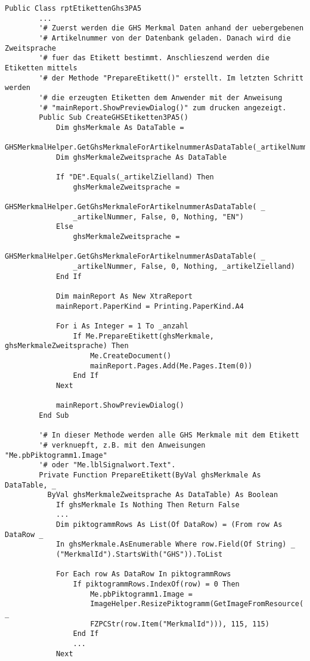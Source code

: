 \begin{lstlisting}[style=A, caption=Auszug Routine Etikettenerstellung (.NET),
label={code:etiketten}]
    Public Class rptEtikettenGhs3PA5
        ...
        '# Zuerst werden die GHS Merkmal Daten anhand der uebergebenen
        '# Artikelnummer von der Datenbank geladen. Danach wird die Zweitsprache
        '# fuer das Etikett bestimmt. Anschlieszend werden die Etiketten mittels
        '# der Methode "PrepareEtikett()" erstellt. Im letzten Schritt werden 
        '# die erzeugten Etiketten dem Anwender mit der Anweisung
        '# "mainReport.ShowPreviewDialog()" zum drucken angezeigt.
        Public Sub CreateGHSEtiketten3PA5()
            Dim ghsMerkmale As DataTable = 
            GHSMerkmalHelper.GetGhsMerkmaleForArtikelnummerAsDataTable(_artikelNummer)
            Dim ghsMerkmaleZweitsprache As DataTable
    
            If "DE".Equals(_artikelZielland) Then
                ghsMerkmaleZweitsprache = 
                GHSMerkmalHelper.GetGhsMerkmaleForArtikelnummerAsDataTable( _ 
                _artikelNummer, False, 0, Nothing, "EN")
            Else
                ghsMerkmaleZweitsprache = 
                GHSMerkmalHelper.GetGhsMerkmaleForArtikelnummerAsDataTable( _ 
                _artikelNummer, False, 0, Nothing, _artikelZielland)
            End If
    
            Dim mainReport As New XtraReport
            mainReport.PaperKind = Printing.PaperKind.A4
    
            For i As Integer = 1 To _anzahl
                If Me.PrepareEtikett(ghsMerkmale, ghsMerkmaleZweitsprache) Then
                    Me.CreateDocument()
                    mainReport.Pages.Add(Me.Pages.Item(0))
                End If
            Next
    
            mainReport.ShowPreviewDialog()
        End Sub
        
        '# In dieser Methode werden alle GHS Merkmale mit dem Etikett
        '# verknuepft, z.B. mit den Anweisungen "Me.pbPiktogramm1.Image" 
        '# oder "Me.lblSignalwort.Text".
        Private Function PrepareEtikett(ByVal ghsMerkmale As DataTable, _
          ByVal ghsMerkmaleZweitsprache As DataTable) As Boolean
            If ghsMerkmale Is Nothing Then Return False
            ...
            Dim piktogrammRows As List(Of DataRow) = (From row As DataRow _ 
            In ghsMerkmale.AsEnumerable Where row.Field(Of String) _
            ("MerkmalId").StartsWith("GHS")).ToList
            
            For Each row As DataRow In piktogrammRows
                If piktogrammRows.IndexOf(row) = 0 Then
                    Me.pbPiktogramm1.Image = 
                    ImageHelper.ResizePiktogramm(GetImageFromResource( _
                    FZPCStr(row.Item("MerkmalId"))), 115, 115)
                End If
                ...
            Next
    

\end{lstlisting}
